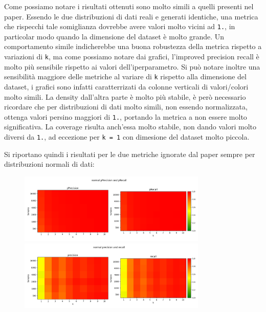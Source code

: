 Come possiamo notare i risultati ottenuti sono molto simili a quelli presenti nel paper. Essendo le due distribuzioni di dati reali e generati identiche, una metrica che rispecchi tale somiglianza dovrebbe avere valori molto vicini ad \texttt{1.}, in particolar modo quando la dimensione del dataset è molto grande.
Un comportamento simile indicherebbe una buona robustezza della metrica rispetto a variazioni di \texttt{k}, ma come possiamo notare dai grafici, l'improved precision recall è molto più sensibile rispetto ai valori dell'iperparametro. 
Si può notare inoltre una sensibilità maggiore delle metriche al variare di \texttt{k} rispetto alla dimensione del dataset, i grafici sono infatti caratterrizati da colonne verticali di valori/colori molto simili.
La density dall'altra parte è molto più stabile, è però necessario ricordare che per distribuzioni di dati molto simili, non essendo normalizzata, ottenga valori persino maggiori di \texttt{1.}, portando la metrica a non essere molto significativa.
La coverage risulta anch'essa molto stabile, non dando valori molto diversi da \texttt{1.}, ad eccezione per \texttt{k = 1} con dimesione del dataset molto piccola.

Si riportano quindi i risultati per le due metriche ignorate dal paper sempre per distribuzioni normali di dati:

\begin{figure}[h!]
    \centering
    \includegraphics[width=0.8\textwidth]{../images/toyexperiments/kdim/normal_pPrecision_pRecall.png} 
    \includegraphics[width=0.8\textwidth]{../images/toyexperiments/kdim/normal_precision_recall.png} 
\end{figure}

